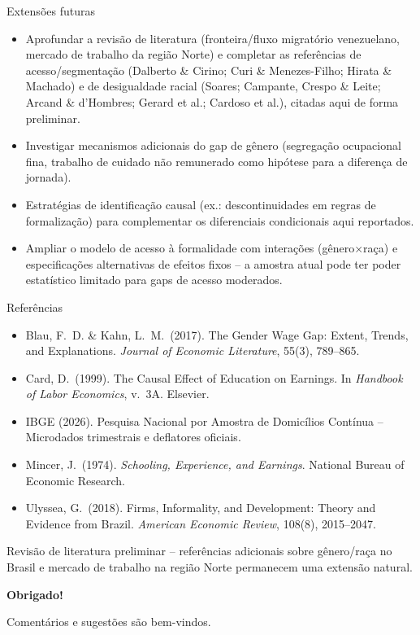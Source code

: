 \documentclass[aspectratio=169]{beamer}
\begin{document}
\begin{frame}{Extens\~oes futuras}
  \footnotesize
  \begin{itemize}
    \item Aprofundar a revis\~ao de literatura (fronteira/fluxo migrat\'orio venezuelano, mercado de trabalho da regi\~ao Norte) e completar as refer\^encias de acesso/segmenta\c{c}\~ao (Dalberto \& Cirino; Curi \& Menezes-Filho; Hirata \& Machado) e de desigualdade racial (Soares; Campante, Crespo \& Leite; Arcand \& d'Hombres; Gerard et al.; Cardoso et al.), citadas aqui de forma preliminar.
    \item Investigar mecanismos adicionais do gap de g\^enero (segrega\c{c}\~ao ocupacional fina, trabalho de cuidado n\~ao remunerado como hip\'otese para a diferen\c{c}a de jornada).
    \item Estrat\'egias de identifica\c{c}\~ao causal (ex.: descontinuidades em regras de formaliza\c{c}\~ao) para complementar os diferenciais condicionais aqui reportados.
    \item Ampliar o modelo de acesso \`a formalidade com intera\c{c}\~oes (g\^enero$\times$ra\c{c}a) e especifica\c{c}\~oes alternativas de efeitos fixos -- a amostra atual pode ter poder estat\'istico limitado para gaps de acesso moderados.
  \end{itemize}
\end{frame}

\begin{frame}{Refer\^encias}
  \footnotesize
  \begin{itemize}
    \item Blau, F.\ D. \& Kahn, L.\ M.\ (2017). The Gender Wage Gap: Extent, Trends, and Explanations. \textit{Journal of Economic Literature}, 55(3), 789--865.
    \item Card, D.\ (1999). The Causal Effect of Education on Earnings. In \textit{Handbook of Labor Economics}, v.\ 3A. Elsevier.
    \item IBGE (2026). Pesquisa Nacional por Amostra de Domic\'ilios Cont\'inua -- Microdados trimestrais e deflatores oficiais.
    \item Mincer, J.\ (1974). \textit{Schooling, Experience, and Earnings}. National Bureau of Economic Research.
    \item Ulyssea, G.\ (2018). Firms, Informality, and Development: Theory and Evidence from Brazil. \textit{American Economic Review}, 108(8), 2015--2047.
  \end{itemize}
  \vspace{2mm}
  {\scriptsize Revis\~ao de literatura preliminar -- refer\^encias adicionais sobre g\^enero/ra\c{c}a no Brasil e mercado de trabalho na regi\~ao Norte permanecem uma extens\~ao natural.}
\end{frame}

\begin{frame}[plain]
  \centering
  {\Huge\color{accentblue}\bfseries Obrigado!}
  \vspace{6mm}

  {\large Coment\'arios e sugest\~oes s\~ao bem-vindos.}
\end{frame}
\end{document}
